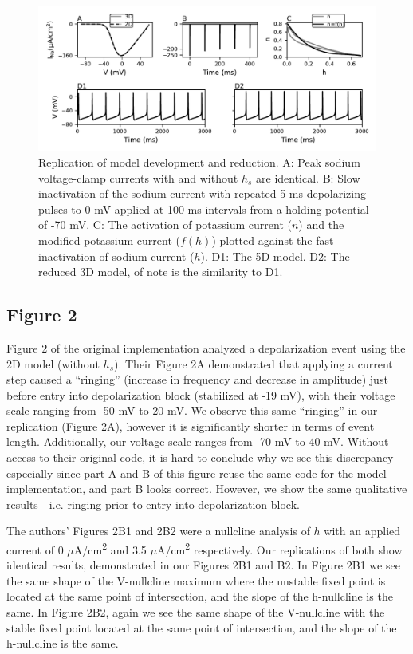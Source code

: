 \begin{figure}
	\centering
	\includegraphics[scale=0.7]{../figures/figure_1.pdf}
	\caption{Replication of model development and reduction. A: Peak sodium voltage-clamp currents with and without $h_s$ are identical. B: Slow inactivation of the sodium current with repeated 5-ms depolarizing pulses to 0 mV applied at 100-ms intervals from a holding potential of -70 mV. C: The activation of potassium current ($n$) and the modified potassium current ($f(h)$) plotted against the fast inactivation of sodium current ($h$). D1: The 5D model. D2: The reduced 3D model, of note is the similarity to D1.}
	\label{fig:1}
\end{figure}

\subsection{Figure 2}

Figure 2 of the original implementation analyzed a depolarization event using the 2D model (without $h_s$). Their Figure 2A demonstrated that applying a current step caused a ``ringing'' (increase in frequency and decrease in amplitude) just before entry into depolarization block (stabilized at -19 mV), with their voltage scale ranging from -50 mV to 20 mV. We observe this same ``ringing'' in our replication (Figure 2A), however it is significantly shorter in terms of event length. Additionally, our voltage scale ranges from -70 mV to 40 mV. Without access to their original code, it is hard to conclude why we see this discrepancy especially since part A and B of this figure reuse the same code for the model implementation, and part B looks correct. However, we show the same qualitative results - i.e. ringing prior to entry into depolarization block.

The authors' Figures 2B1 and 2B2 were a nullcline analysis of $h$ with an applied current of 0 $\mu$A/cm\textsuperscript{2} and 3.5 $\mu$A/cm\textsuperscript{2} respectively. Our replications of both show identical results, demonstrated in our Figures 2B1 and B2. In Figure 2B1 we see the same shape of the V-nullcline maximum where the unstable fixed point is located at the same point of intersection, and the slope of the h-nullcline is the same. In Figure 2B2, again we see the same shape of the V-nullcline with the stable fixed point located at the same point of intersection, and the slope of the h-nullcline is the same.

